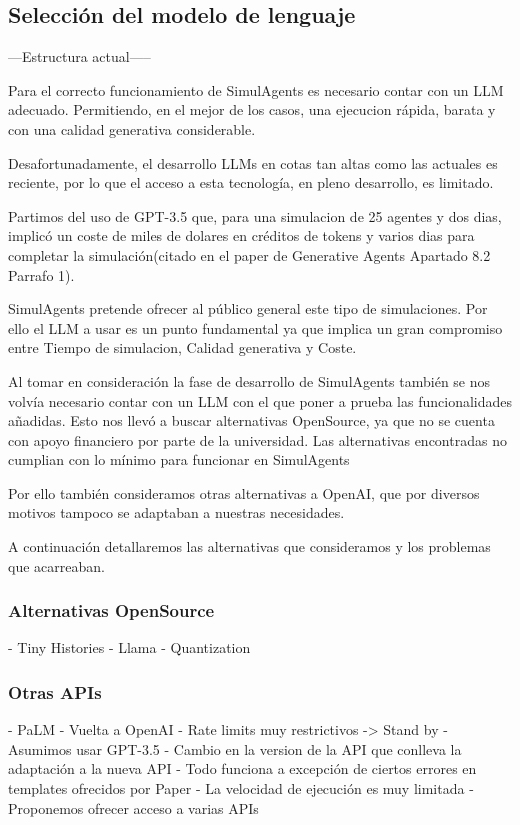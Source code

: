 \subsection{Selección del modelo de lenguaje}\label{subsec:Selección del modelo de lenguaje}


---Estructura actual-----

Para el correcto funcionamiento de SimulAgents es necesario contar con un LLM adecuado. Permitiendo, en el mejor de los casos, una ejecucion rápida, barata y con una calidad generativa considerable.

Desafortunadamente, el desarrollo LLMs en cotas tan altas como las actuales es reciente, por lo que el acceso a esta tecnología, en pleno desarrollo, es limitado.

Partimos del uso de GPT-3.5 que, para una simulacion de 25 agentes y dos dias, implicó un coste de miles de dolares en créditos de tokens y varios dias para completar la simulación(citado en el paper de Generative Agents Apartado 8.2 Parrafo 1).

SimulAgents pretende ofrecer al público general este tipo de simulaciones.
Por ello el LLM a usar es un punto fundamental ya que implica un gran compromiso entre Tiempo de simulacion, Calidad generativa y Coste.

Al tomar en consideración la fase de desarrollo de SimulAgents también se nos volvía necesario contar con un LLM con el que poner a prueba las funcionalidades añadidas.
Esto nos llevó a buscar alternativas OpenSource, ya que no se cuenta con apoyo financiero por parte de la universidad.
Las alternativas encontradas no cumplian con lo mínimo para funcionar en SimulAgents

Por ello también consideramos otras alternativas a OpenAI, que por diversos motivos tampoco se adaptaban a nuestras necesidades.

A continuación detallaremos las alternativas que consideramos y los problemas que acarreaban.

\subsubsection{Alternativas OpenSource}
 - Tiny Histories
 - Llama
 - Quantization
\subsubsection{Otras APIs}
 - PaLM
 - Vuelta a OpenAI
 	- Rate limits muy restrictivos -> Stand by
 	- Asumimos usar GPT-3.5
 	 - Cambio en la version de la API que conlleva la adaptación a la nueva API
 	 - Todo funciona a excepción de ciertos errores en templates ofrecidos por Paper
 	 - La velocidad de ejecución es muy limitada
 	 - Proponemos ofrecer acceso a varias APIs

